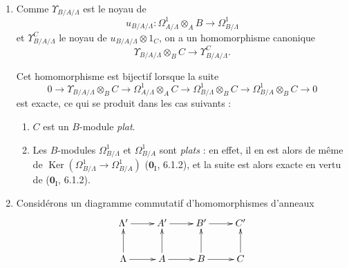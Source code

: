 \begin{remarks}[20.6.21]
\label{0.20.6.21-fr}
\begin{enumerate}
  \item[\rm(i)] Comme $\Upsilon_{B/A/\Lambda}$ est le noyau de
  \[
    u_{B/A/\Lambda}:\Omega^1_{A/\Lambda}\otimes_A B
    \to\Omega^1_{B/\Lambda}
  \]
  et $\Upsilon^C_{B/A/\Lambda}$ le noyau de
  $u_{B/A/\Lambda}\otimes1_C$, on a un homomorphisme canonique
\begin{equation}
\tag{20.6.21.1}
\label{0.20.6.21.1-fr}
  \Upsilon_{B/A/\Lambda}\otimes_B C\to\Upsilon^C_{B/A/\Lambda}.
\end{equation}

Cet homomorphisme est bijectif lorsque la suite
\begin{equation}
\tag{20.6.21.2}
\label{0.20.6.21.2-fr}
  0\to\Upsilon_{B/A/\Lambda}\otimes_B C\to
  \Omega^1_{A/\Lambda}\otimes_A C\to
  \Omega^1_{B/\Lambda}\otimes_B C\to
  \Omega^1_{B/A}\otimes_B C\to0
\end{equation}
est exacte, ce qui se produit dans les cas suivants :
\begin{enumerate}
  \item[$1^\circ$] $C$ est un $B$-module \emph{plat}.
  \item[$2^\circ$] Les $B$-modules $\Omega^1_{B/\Lambda}$ et
  $\Omega^1_{B/A}$ sont \emph{plats} : en effet, il en est alors de même de
  $\operatorname{Ker}(\Omega^1_{B/\Lambda}\to\Omega^1_{B/A})$
  ($\mathbf{0}_{\mathrm I}$, 6.1.2), et la suite  est alors
  exacte en vertu de ($\mathbf{0}_{\mathrm I}$, 6.1.2).
\end{enumerate}
  \item[\rm(ii)] Considérons un diagramme commutatif d'homomorphismes
  d'anneaux
\[
\xymatrix{
  \Lambda' \ar[r] & A' \ar[r] & B' \ar[r] & C' \\
  \Lambda \ar[u] \ar[r] & A \ar[u] \ar[r] & B \ar[u] \ar[r] & C \ar[u]
}
\]


\end{enumerate}
\end{remarks}
